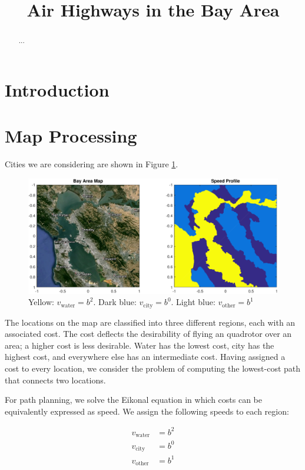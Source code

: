 \documentclass[12pt,draftcls,onecolumn]{IEEEtran}
\title{\LARGE \bf Air Highways in the Bay Area}
\author{}
\numberwithin{algorithm}{section}
\begin{document}
\maketitle

\thispagestyle{empty}
\pagestyle{empty}

\begin{abstract}
...
\end{abstract}

\section{Introduction}

\section{Map Processing}
Cities we are considering are shown in Figure \ref{fig:mapSpeed}.
\begin{figure}
	\centering
	\includegraphics[width=\textwidth]{"fig/mapSpeed"}
	\caption{Yellow: $v_{\text{water}} = b^2$. Dark blue: $v_{\text{city}} = b^0$. Light blue: $v_{\text{other}} = b^1$}
	\label{fig:mapSpeed}
\end{figure}

The locations on the map are classified into three different regions, each with an associated cost. The cost deflects the desirability of flying an quadrotor over an area; a higher cost is less desirable. Water has the lowest cost, city has the highest cost, and everywhere else has an intermediate cost. Having assigned a cost to every location, we consider the problem of computing the lowest-cost path that connects two locations.

For path planning, we solve the Eikonal equation in which costs can be equivalently expressed as speed. We assign the following speeds to each region:

\begin{equation}
\begin{aligned}
v_{\text{water}} &= b^2 \\
v_{\text{city}} &= b^0 \\
v_{\text{other}} &= b^1
\end{aligned}
\end{equation}
\end{document}
